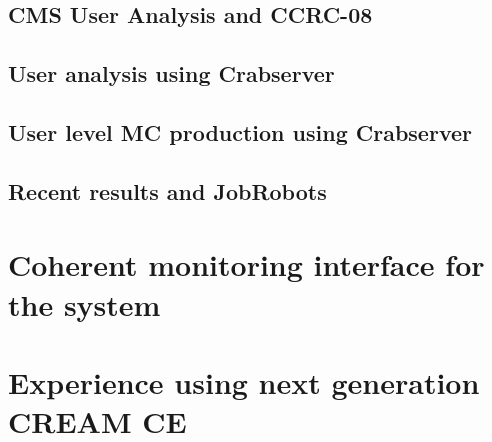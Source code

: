 \documentclass[a4paper]{jpconf}
\begin{document}
\subsection{CMS User Analysis and CCRC-08}



\subsection{User analysis using Crabserver}



\subsection{User level MC production using Crabserver}



\subsection{Recent results and JobRobots}



\section{Coherent monitoring interface for the system}



\section{Experience using next generation CREAM CE}
\end{document}
